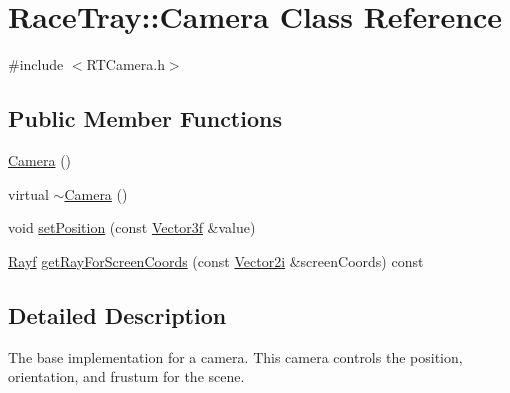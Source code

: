 \hypertarget{class_race_tray_1_1_camera}{\section{Race\-Tray\-:\-:Camera Class Reference}
\label{class_race_tray_1_1_camera}
}


{\ttfamily \#include $<$R\-T\-Camera.\-h$>$}

\subsection*{Public Member Functions}
\begin{DoxyCompactItemize}
\item 
\hyperlink{class_race_tray_1_1_camera_a5ab9a559e061b99cca224016f20221d7}{Camera} ()
\item 
virtual \hyperlink{class_race_tray_1_1_camera_a1f42cbe430d94b69f3300305f75dc7fc}{$\sim$\-Camera} ()
\item 
void \hyperlink{class_race_tray_1_1_camera_ac2e1075c47d81ca80d50ed2593c8627b}{set\-Position} (const \hyperlink{group___math_gadb6fa781064c3c3c9b13eb984adae162}{Vector3f} \&value)
\item 
\hyperlink{group___math_ga5fdea6c2a8db84c0cc5b7aaeeb48b17a}{Rayf} \hyperlink{class_race_tray_1_1_camera_af07b4472aa7f1c48b32bc38c4f6f6982}{get\-Ray\-For\-Screen\-Coords} (const \hyperlink{group___math_gad3de4c43503d95985d8e4fcbf1a8bc16}{Vector2i} \&screen\-Coords) const 
\end{DoxyCompactItemize}


\subsection{Detailed Description}
The base implementation for a camera. This camera controls the position, orientation, and frustum for the scene. 

